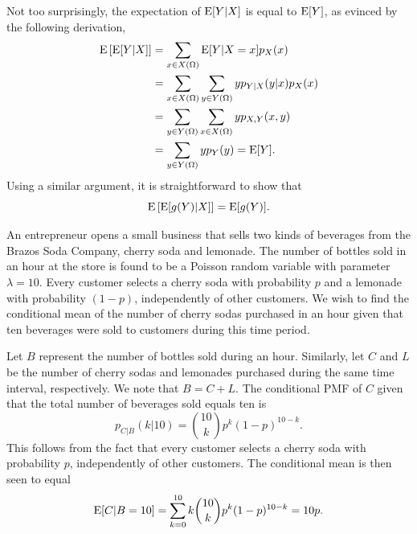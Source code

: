 Not too surprisingly, the expectation of $\mathrm{E} [Y | X]$ is equal to $\mathrm{E} [Y]$, as evinced by the following derivation,
\begin{equation*}
\begin{split}
\mathrm{E} \left[ \mathrm{E} [Y | X] \right]
&= \sum_{x \in X(\Omega)} \mathrm{E} [Y | X = x] p_X (x) \\
&= \sum_{x \in X(\Omega)} \sum_{y \in Y(\Omega)} y p_{Y|X} (y|x) p_X (x) \\
&= \sum_{y \in Y(\Omega)} \sum_{x \in X(\Omega)} y p_{X,Y} (x, y) \\
&= \sum_{y \in Y(\Omega)} y p_{Y} (y)
= \mathrm{E} [Y] .
\end{split}
\end{equation*}
Using a similar argument, it is straightforward to show that
\begin{equation*}
\mathrm{E} \left[ \mathrm{E} [g (Y) | X] \right] = \mathrm{E} [g(Y)] .
\end{equation*}

\begin{example}
An entrepreneur opens a small business that sells two kinds of beverages from the Brazos Soda Company, cherry soda and lemonade.
The number of bottles sold in an hour at the store is found to be a Poisson random variable with parameter $\lambda = 10$.
Every customer selects a cherry soda with probability $p$ and a lemonade with probability $(1 - p)$, independently of other customers.
We wish to find the conditional mean of the number of cherry sodas purchased in an hour given that ten beverages were sold to customers during this time period.

Let $B$ represent the number of bottles sold during an hour.
Similarly, let $C$ and $L$ be the number of cherry sodas and lemonades purchased during the same time interval, respectively.
We note that $B = C + L$.
The conditional PMF of $C$ given that the total number of beverages sold equals ten is
\begin{equation} \label{equation:ConditionalPoisson}
p_{C|B} (k | 10)
= \binom{10}{k} p^k (1-p)^{10-k} .
\end{equation}
This follows from the fact that every customer selects a cherry soda with probability $p$, independently of other customers.
The conditional mean is then seen to equal
\begin{equation*}
\mathrm{E} [ C | B=10] = \sum_{k=0}^{10}
k \binom{10}{k} p^k (1-p)^{10-k} = 10 p .
\end{equation*}
\end{example}


